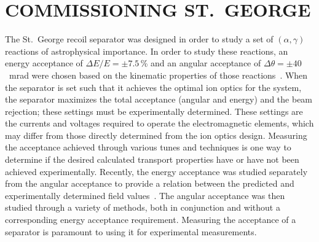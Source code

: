 \chapter{COMMISSIONING ST.\ GEORGE}
\label{ch:commissioning}

The St.\ George recoil separator was designed in order to study a set of
$(\alpha,\gamma)$ reactions of astrophysical importance. In order to
study these reactions, an energy acceptance of $\Delta E/E = \pm7.5$\,\%
and an angular acceptance of $\Delta\theta = \pm40$~mrad were chosen
based on the kinematic properties of those reactions~\cite{Couder2008}.
When the separator is set such that it achieves the optimal ion optics
for the system, the separator maximizes the total acceptance (angular
and energy) and the beam rejection; these settings must be
experimentally determined. These settings are the currents and voltages
required to operate the electromagnetic elements, which may differ from
those directly determined from the ion optics design. Measuring the
acceptance achieved through various tunes and techniques is one way to
determine if the desired calculated transport properties have or have
not been achieved experimentally. Recently, the energy acceptance was
studied separately from the angular acceptance to provide a relation
between the predicted and experimentally determined field
values~\cite{Meisel2017}. The angular acceptance was then studied
through a variety of methods, both in conjunction and without a
corresponding energy acceptance requirement. Measuring the acceptance of
a separator is paramount to using it for experimental measurements.

